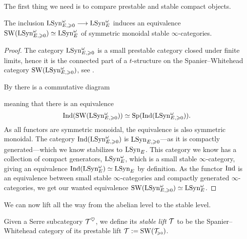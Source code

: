 The first thing we need is to compare prestable and stable compact objects. 

\begin{theorem}
    \label{ch3:add:thm:prestable-freyd-stabilizes-to-stable-Freyd}
    The inclusion $\mathrm{LSyn}_{E, \geqslant 0}^\omega \longrightarrow \mathrm{LSyn}_{E}^\omega$ induces an equivalence $\operatorname{SW}(\mathrm{LSyn}_{E, \geqslant 0}^\omega)\simeq \mathrm{LSyn}_{E}^\omega$ of symmetric monoidal stable $\infty$-categories. 
\end{theorem}
\begin{proof}
    The category $\mathrm{LSyn}_{E, \geqslant 0}^\omega$ is a small prestable category closed under finite limits, hence it is the connected part of a $t$-structure on the Spanier--Whitehead category $\operatorname{SW}(\mathrm{LSyn}_{E, \geqslant 0}^\omega)$, see \cite[C.1.1, C.1.2]{lurie_SAG}. 

    By \cite[C.1.1.6]{lurie_SAG} there is a commutative diagram
    \begin{center}
    \end{center}
    meaning that there is an equivalence
    \[\operatorname{Ind}(\operatorname{SW}(\mathrm{LSyn}_{E, \geqslant 0}^\omega))\simeq \mathrm{Sp}(\operatorname{Ind}(\mathrm{LSyn}_{E, \geqslant 0}^\omega)).\]
    As all functors are symmetric monoidal, the equivalence is also symmetric monoidal. The category $\operatorname{Ind}(\mathrm{LSyn}_{E, \geqslant 0}^\omega)$ is $\mathrm{LSyn}_{E, \geqslant 0}$---as it is compactly generated---which we know stabilizes to $\mathrm{LSyn}_{E}$. This category we know has a collection of compact generators, $\mathrm{LSyn}_{E}^\omega$, which is a small stable $\infty$-category, giving an equivalence $\operatorname{Ind}(\mathrm{LSyn}_{E}^\omega)\simeq \mathrm{LSyn}_{E}$ by definition. As the functor $\operatorname{Ind}$ is an equivalence between small stable $\infty$-categories and compactly generated $\infty$-categories, we get our wanted equivalence $\operatorname{SW}(\mathrm{LSyn}_{E, \geqslant 0}^\omega)\simeq \mathrm{LSyn}_{E}^\omega$. 
\end{proof}

We can now lift all the way from the abelian level to the stable level. 

\begin{definition}
    Given a Serre subcategory $\mathcal{T}^\heartsuit$, we define its \emph{stable lift} $\mathcal{T}$ to be the Spanier--Whitehead category of its prestable lift $\mathcal{T}:= \operatorname{SW}(\mathcal{T}_{\hspace{-1pt}\scriptscriptstyle\geqslant 0})$. 
\end{definition}

